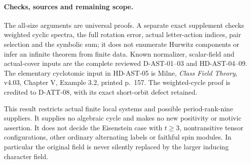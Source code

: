 \paragraph{Checks, sources and remaining scope.}
The all-size arguments are universal proofs.  A separate exact
supplement checks weighted cyclic spectra, the full rotation error,
actual letter-action indices, pair selection and the symbolic sum;
it does not enumerate Hurwitz components or infer an infinite
theorem from finite data.  Known normalizer, scalar-field and
actual-cover inputs are the complete reviewed D-AST-01--03 and
HD-AST-04--09.  The elementary cyclotomic input in HD-AST-05 is
Milne, \emph{Class Field Theory}, v4.03, Chapter V, Example 3.2,
printed p.~157.\cite{HD:MilneCFT2020}  The weighted-cycle proof
is credited to D-ATT-08, with its exact short-orbit defect retained.

This result restricts actual finite local systems and possible
period-rank-nine suppliers.  It supplies no algebraic cycle and
makes no new positivity or motivic assertion.  It does not decide
the Eisenstein case with $t\ge3$, nontransitive tensor configurations,
other ordinary alternating labels or faithful spin modules.  In
particular the original field is never silently replaced by the
larger inducing character field.
